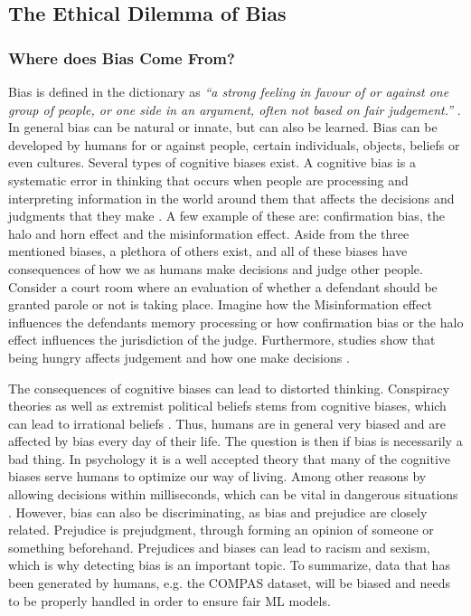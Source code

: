 \documentclass[11pt, fleqn, titlepage]{article}
\begin{document}
	\subsection{The Ethical Dilemma of Bias}\label{ethical_dilemma_of_bias}
	
	\subsubsection{Where does Bias Come From?}\label{rootofbias}
	Bias is defined in the dictionary as \textit{\enquote{a strong feeling in favour of or against one group of people, or one side in an argument, often not based on fair judgement.}} \cite{oxford}. In general bias can be natural or innate,  but can also be learned. Bias can be developed by humans for or against people, certain individuals, objects, beliefs or even cultures. Several types of cognitive biases exist. A cognitive bias is a systematic error in thinking that occurs when people are processing and interpreting information in the world around them that affects the decisions and judgments that they make \cite{verywellmind}. A few example of these are: confirmation bias, the halo and horn effect and the misinformation effect. Aside from the three mentioned biases, a plethora of others exist, and all of these biases have consequences of how we as humans make decisions and judge other people. Consider a court room where an evaluation of whether a defendant should be granted parole or not is taking place. Imagine how the Misinformation effect influences the defendants memory processing or how confirmation bias or the halo effect influences the jurisdiction of the judge. Furthermore, studies show that being hungry affects judgement and how one make decisions \cite{eat}.
	
	The consequences of cognitive biases can lead to distorted thinking. Conspiracy theories as well as extremist political beliefs stems from cognitive biases, which can lead to irrational beliefs \cite{cog_bias}. Thus, humans are in general very biased and are affected by bias every day of their life. The question is then if bias is necessarily a bad thing. In psychology it is a well accepted theory that many of the cognitive biases serve humans to optimize our way of living. Among other reasons by allowing decisions within milliseconds, which can be vital in dangerous situations \cite{reisberg}. However, bias can also be discriminating, as bias and prejudice are closely related. Prejudice is prejudgment, through forming an opinion of someone or something beforehand. Prejudices and biases can lead to racism and sexism, which is why detecting bias is an important topic. To summarize, data that has been generated by humans, e.g. the COMPAS dataset, will be biased and needs to be properly handled in order to ensure fair ML models.
	
\end{document}
